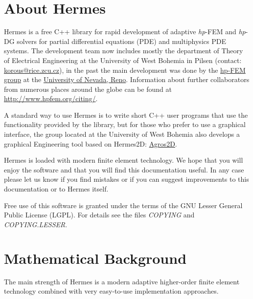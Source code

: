 \documentclass[a4paper,0pt,english]{sphinxmanual}
\let\origfigure=\figure
\renewenvironment{figure}[6]{
\origfigure[H]}
{\endlist}
\begin{document}
\section{About Hermes}
\label{src/about-hermes::doc}\label{src/about-hermes:about-hermes}
Hermes is a free C++ library for rapid development of
adaptive \emph{hp}-FEM and \emph{hp}-DG solvers for partial differential equations (PDE)
and multiphysics PDE systems. The development team now includes mostly the department of Theory of Electrical Engineering at the University of West Bohemia in Pilsen (contact: \href{mailto:korous@rice.zcu.cz}{korous@rice.zcu.cz}), in the past the main development was done by the \href{http://hpfem.org/hermes}{hp-FEM group} at the \href{http://www.unr.edu}{University of Nevada, Reno}.
Information about further collaborators from numerous places around the globe can be found at \href{http://www.hpfem.org/citing/}{http://www.hpfem.org/citing/}.

A standard way to use Hermes is to write short C++ user programs
that use the functionality provided by the library, but for
those who prefer to use a graphical interface, the group located at the
University of West Bohemia also develops a graphical Engineering tool based on Hermes2D:
\href{http://agros2d.org/}{Agros2D}.
\begin{figure}[htbp]
\centering

\end{figure}

Hermes is loaded with modern finite element technology. We hope that you will enjoy
the software and that you will find this documentation useful.
In any case please let us know if you find mistakes
or if you can suggest improvements to this documentation or to Hermes itself.

Free use of this software is granted under the terms of the GNU Lesser General
Public License (LGPL). For details see the files \emph{COPYING} and \emph{COPYING.LESSER}.


\section{Mathematical Background}
\label{src/math-background:mathematical-background}\label{src/math-background::doc}
The main strength of Hermes is a modern adaptive higher-order
finite element technology combined with very easy-to-use implementation approaches.
\end{document}
